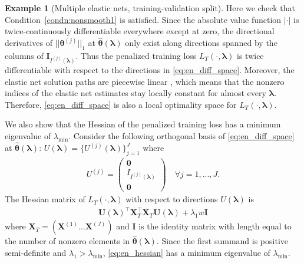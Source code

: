 \documentclass[10pt]{book}
\theoremstyle{definition}
\newtheorem{example}{Example}
\begin{document}
\begin{example}[Multiple elastic nets, training-validation split]
	Here we check that Condition~\ref{condn:nonsmooth1} is satisfied.
	Since the absolute value function $|\cdot|$ is twice-continuously differentiable everywhere except at zero, the directional derivatives of $||\boldsymbol \theta^{(j)}||_1$ at $\hat{\boldsymbol{\theta}}(\boldsymbol{\lambda})$ only exist along directions spanned by the columns of $\boldsymbol I_{I^{(j)}(\boldsymbol \lambda)}$.
	Thus the penalized training loss $L_T(\cdot, \boldsymbol{\lambda})$ is twice differentiable with respect to the directions in \eqref{eq:en_diff_space}.
	Moreover, the elastic net solution paths are piecewise linear \citep{zou2003regression}, which means that the nonzero indices of the elastic net estimates stay locally constant for almost every $\boldsymbol{\lambda}$. Therefore, \eqref{eq:en_diff_space} is also a local optimality space for $L_T(\cdot, \boldsymbol{\lambda})$.
	
	We also show that the Hessian of the penalized training loss has a minimum eigenvalue of $\lambda_{\min}$.
	Consider the following orthogonal basis of \eqref{eq:en_diff_space} at $\hat{\boldsymbol{\theta}}(\boldsymbol{\lambda})$: $U(\boldsymbol{\lambda}) = \{U^{(j)}(\boldsymbol{\lambda})\}_{j = 1}^J$ where
	\begin{align}
	U^{(j)} =
	\left(
	\begin{matrix}
	\boldsymbol{0} \\
	I_{I^{(j)}(\boldsymbol \lambda)}\\
	\boldsymbol{0}
	\end{matrix}
	\right)
	\quad \forall j = 1,...,J.
	\end{align}
	The Hessian matrix of $L_T(\cdot, \boldsymbol{\lambda})$ with respect to directions $U(\boldsymbol{\lambda})$ is
	\begin{align}
	\boldsymbol U(\boldsymbol{\lambda})^\top \boldsymbol{X}_{T}^\top \boldsymbol{X}_{T} \boldsymbol U(\boldsymbol{\lambda}) + \lambda_1 w \boldsymbol{I}
	\label{eq:en_hessian}
	\end{align}
	where $\boldsymbol{X}_{T} = (\boldsymbol{X}^{(1)} ... \boldsymbol{X}^{(J)})$
	and $\boldsymbol{I}$ is the identity matrix with length equal to the number of nonzero elements in $\hat{\boldsymbol{\theta}}(\boldsymbol{\lambda})$.
	Since the first summand is positive semi-definite and $\lambda_1 > \lambda_{\min}$, \eqref{eq:en_hessian} has a minimum eigenvalue of $\lambda_{\min}$.
\end{example}




\end{document}

